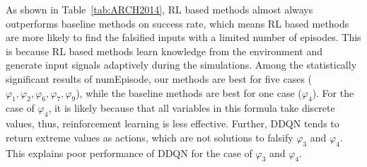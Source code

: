 As shown in Table~\ref{tab:ARCH2014}, RL based methods almost always outperforms baseline methods on success rate, which means RL based methods are more likely to find the falsified inputs with a limited number of episodes.
This is because RL based methods learn knowledge from the environment and generate input signals adaptively during the simulations.
Among the statistically significant results of numEpisode, our methods are best for five cases ($\varphi_1, \varphi_2,\varphi_6,\varphi_7,\varphi_9$), while the baseline methods are best for one case ($\varphi_4$).
For the case of $\varphi_4$, it is likely because that
all variables in this formula take discrete values,
thus, reinforcement learning is less effective.
Further, DDQN tends to return extreme values as actions,
which are not solutions to falsify $\varphi_3$ and $\varphi_4$.
This explains poor performance of DDQN for the case of $\varphi_3$ and $\varphi_4$.


